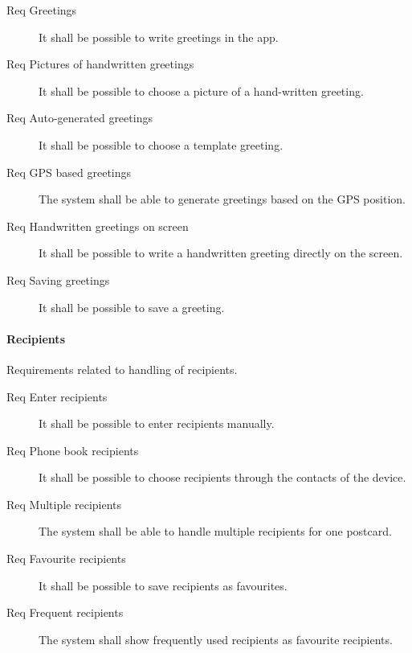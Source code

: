 \documentclass[10pt,a4paper]{article}
\begin{document}
\begin{description}
	\item [Req  Greetings] It shall be possible to write greetings in the app.
	\item [Req  Pictures of handwritten greetings] It shall be possible to choose a picture of a hand-written greeting.
	\item [Req  Auto-generated greetings] It shall be possible to choose a template greeting.
	\item [Req  GPS based greetings] The system shall be able to generate greetings based on the GPS position.
	\item [Req  Handwritten greetings on screen] It shall be possible to write a handwritten greeting directly on the screen.
	\item [Req  Saving greetings] It shall be possible to save a greeting.
\end{description}

\paragraph{Recipients}
Requirements related to handling of recipients.

\begin{description}
	\item [Req  Enter recipients] It shall be possible to enter recipients manually.
	\item [Req  Phone book recipients] It shall be possible to choose recipients through the contacts of the device.
	\item [Req  Multiple recipients] The system shall be able to handle multiple recipients for one postcard.
	\item [Req  Favourite recipients] It shall be possible to save recipients as favourites.
	\item [Req  Frequent recipients] The system shall show frequently used recipients as favourite recipients.
\end{description}
\end{document}

